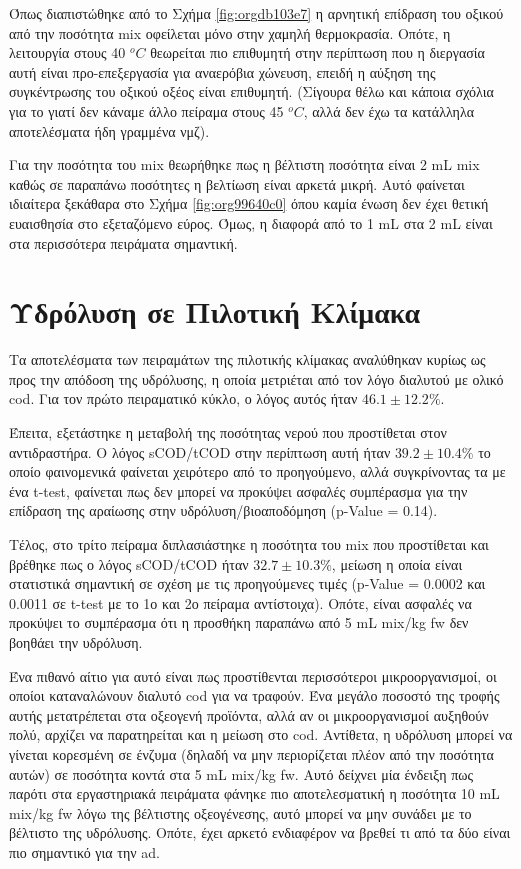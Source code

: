 \documentclass[11pt]{report}
\begin{document}
Όπως διαπιστώθηκε από το Σχήμα \ref{fig:orgdb103e7} η αρνητική επίδραση του οξικού από την ποσότητα \acrshort{mix} οφείλεται μόνο στην χαμηλή θερμοκρασία. Οπότε, η λειτουργία στους 40 \(^oC\) θεωρείται πιο επιθυμητή στην περίπτωση που η διεργασία αυτή είναι προ-επεξεργασία για αναερόβια χώνευση, επειδή η αύξηση της συγκέντρωσης του οξικού οξέος είναι επιθυμητή. (Σίγουρα θέλω και κάποια σχόλια για το γιατί δεν κάναμε άλλο πείραμα στους 45 \(^oC\), αλλά δεν έχω τα κατάλληλα αποτελέσματα ήδη γραμμένα νμζ).

Για την ποσότητα του \acrshort{mix} θεωρήθηκε πως η βέλτιστη ποσότητα είναι 2 mL \acrshort{mix} καθώς σε παραπάνω ποσότητες η βελτίωση είναι αρκετά μικρή. Αυτό φαίνεται ιδιαίτερα ξεκάθαρα στο Σχήμα \ref{fig:org99640c0} όπου καμία ένωση δεν έχει θετική ευαισθησία στο εξεταζόμενο εύρος. Όμως, η διαφορά από το 1 mL στα 2 mL είναι στα περισσότερα πειράματα σημαντική.

\section{Υδρόλυση σε Πιλοτική Κλίμακα}
\label{sec:org0a8439b}
Τα αποτελέσματα των πειραμάτων της πιλοτικής κλίμακας αναλύθηκαν κυρίως ως προς την απόδοση της υδρόλυσης, η οποία μετριέται από τον λόγο διαλυτού με ολικό \acrshort{cod}. Για τον πρώτο πειραματικό κύκλο, ο λόγος αυτός ήταν \(46.1 \pm 12.2 \%\).

Έπειτα, εξετάστηκε η μεταβολή της ποσότητας νερού που προστίθεται στον αντιδραστήρα. Ο λόγος sCOD/tCOD στην περίπτωση αυτή ήταν \(39.2 \pm 10.4 \%\) το οποίο φαινομενικά φαίνεται χειρότερο από το προηγούμενο, αλλά συγκρίνοντας τα με ένα t-test, φαίνεται πως δεν μπορεί να προκύψει ασφαλές συμπέρασμα για την επίδραση της αραίωσης στην υδρόλυση/βιοαποδόμηση (p-Value = 0.14). 

Τέλος, στο τρίτο πείραμα διπλασιάστηκε η ποσότητα του \acrshort{mix} που προστίθεται και βρέθηκε πως ο λόγος sCOD/tCOD ήταν \(32.7 \pm 10.3 \%\), μείωση η οποία είναι στατιστικά σημαντική σε σχέση με τις προηγούμενες τιμές (p-Value = 0.0002 και 0.0011 σε t-test με το 1ο και 2ο πείραμα αντίστοιχα). Οπότε, είναι ασφαλές να προκύψει το συμπέρασμα ότι η προσθήκη παραπάνω από 5 mL \acrshort{mix}/kg \acrshort{fw} δεν βοηθάει την υδρόλυση.

Ένα πιθανό αίτιο για αυτό είναι πως προστίθενται περισσότεροι μικροοργανισμοί, οι οποίοι καταναλώνουν διαλυτό \acrshort{cod} για να τραφούν. Ένα μεγάλο ποσοστό της τροφής αυτής μετατρέπεται στα οξεογενή προϊόντα, αλλά αν οι μικροοργανισμοί αυξηθούν πολύ, αρχίζει να παρατηρείται και η μείωση στο \acrshort{cod}. Αντίθετα, η υδρόλυση μπορεί να γίνεται κορεσμένη σε ένζυμα (δηλαδή να μην περιορίζεται πλέον από την ποσότητα αυτών) σε ποσότητα κοντά στα 5 mL \acrshort{mix}/kg \acrshort{fw}. Αυτό δείχνει μία ένδειξη πως παρότι στα εργαστηριακά πειράματα φάνηκε πιο αποτελεσματική η ποσότητα 10 mL \acrshort{mix}/kg \acrshort{fw} λόγω της βέλτιστης οξεογένεσης, αυτό μπορεί να μην συνάδει με το βέλτιστο της υδρόλυσης. Οπότε, έχει αρκετό ενδιαφέρον να βρεθεί τι από τα δύο είναι πιο σημαντικό για την \acrshort{ad}.
\end{document}
